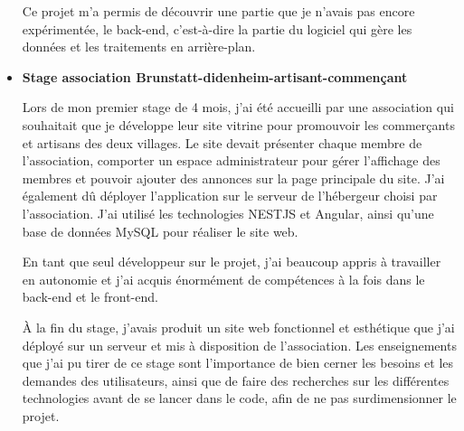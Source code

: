 \documentclass[12pt]{article}
\begin{document}
\begin{itemize}
        \newline Ce projet m'a permis de découvrir une partie que je n'avais pas encore expérimentée, le back-end, c'est-à-dire la partie du logiciel qui gère les données et les traitements en arrière-plan.
    
    \item \textbf{Stage association Brunstatt-didenheim-artisant-commençant} 
   
        \newline Lors de mon premier stage de 4 mois, j'ai été accueilli par une association qui souhaitait que je développe leur site vitrine pour promouvoir les commerçants et artisans des deux villages. Le site devait présenter chaque membre de l'association, comporter un espace administrateur pour gérer l'affichage des membres et pouvoir ajouter des annonces sur la page principale du site. J'ai également dû déployer l'application sur le serveur de l'hébergeur choisi par l'association. J'ai utilisé les technologies NESTJS et Angular, ainsi qu'une base de données MySQL pour réaliser le site web.

       \newline En tant que seul développeur sur le projet, j'ai beaucoup appris à travailler en autonomie et j'ai acquis énormément de compétences à la fois dans le back-end et le front-end.

        \newline À la fin du stage, j'avais produit un site web fonctionnel et esthétique que j'ai déployé sur un serveur et mis à disposition de l'association. Les enseignements que j'ai pu tirer de ce stage sont l'importance de bien cerner les besoins et les demandes des utilisateurs, ainsi que de faire des recherches sur les différentes technologies avant de se lancer dans le code, afin de ne pas surdimensionner le projet.
\end{itemize}
\end{document}
